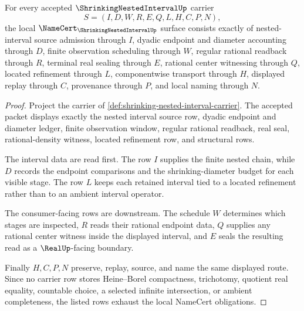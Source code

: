 \begin{theorem}\label{thm:shrinking-nested-interval-namecert-obligations}
For every accepted $\ShrinkingNestedIntervalUp$ carrier
$$
S=(I,D,W,R,E,Q,L,H,C,P,N),
$$
the local $\NameCert_{\ShrinkingNestedIntervalUp}$ surface consists exactly of nested-interval source admission through $I$, dyadic endpoint and diameter accounting through $D$, finite observation scheduling through $W$, regular rational readback through $R$, terminal real sealing through $E$, rational center witnessing through $Q$, located refinement through $L$, componentwise transport through $H$, displayed replay through $C$, provenance through $P$, and local naming through $N$.
\end{theorem}
\begin{proof}
Project the carrier of \autoref{def:shrinking-nested-interval-carrier}. The accepted packet displays exactly the nested interval source row, dyadic endpoint and diameter ledger, finite observation window, regular rational readback, real seal, rational-density witness, located refinement row, and structural rows.

The interval data are read first. The row $I$ supplies the finite nested chain, while $D$ records the endpoint comparisons and the shrinking-diameter budget for each visible stage. The row $L$ keeps each retained interval tied to a located refinement rather than to an ambient interval operator.

The consumer-facing rows are downstream. The schedule $W$ determines which stages are inspected, $R$ reads their rational endpoint data, $Q$ supplies any rational center witness inside the displayed interval, and $E$ seals the resulting read as a $\RealUp$-facing boundary.

Finally $H,C,P,N$ preserve, replay, source, and name the same displayed route. Since no carrier row stores Heine--Borel compactness, trichotomy, quotient real equality, countable choice, a selected infinite intersection, or ambient completeness, the listed rows exhaust the local NameCert obligations.
\end{proof}

